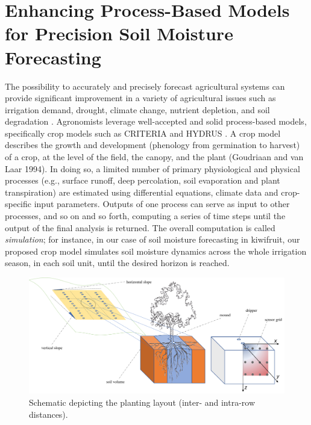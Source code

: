 \chapter{Enhancing Process-Based Models for Precision Soil Moisture Forecasting}
\label{physics-aware-chap:orchard}

The possibility to accurately and precisely forecast agricultural systems can provide significant improvement in a variety of agricultural issues such as irrigation demand, drought, climate change, nutrient depletion, and soil degradation \cite{vitali2021crop}.
Agronomists leverage well-accepted and solid process-based models, specifically crop models such as CRITERIA \cite{Bittelli2011253} and HYDRUS \cite{hydrus2008587}.
A crop model describes the growth and development (phenology from germination to harvest) of a crop, at the level of the field, the canopy, and the plant (Goudriaan and van Laar 1994).
In doing so, a limited number of primary physiological and physical processes (e.g., surface runoff, deep percolation, soil evaporation and plant transpiration) are estimated using differential equations, climate data and crop-specific input parameters.
Outputs of one process can serve as input to other processes, and so on and so forth, computing a series of time steps until the output of the final analysis is returned.
The overall computation is called \textit{simulation}; for instance, in our case of soil moisture forecasting in kiwifruit, our proposed crop model simulates soil moisture dynamics across the whole irrigation season, in each soil unit, until the desired horizon is reached.

\begin{figure}[t]
	\centering
	\includegraphics[scale=0.5]{chapters/physics-aware/orchard/img/OverallPlantingLayout3.png}
	\caption{Schematic depicting the planting layout (inter- and intra-row distances).}
	\label{orchard-fig:scheme1}
\end{figure}

